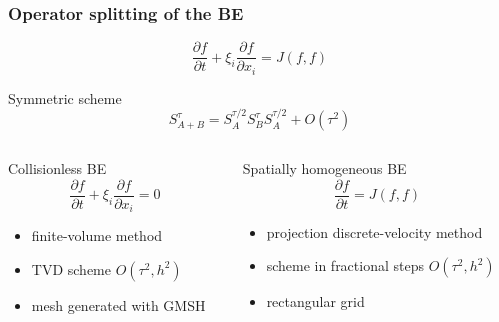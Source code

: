 \documentclass[mathserif]{beamer} %
\newcommand{\pder}[2][]{\frac{\partial#1}{\partial#2}}
\newcommand{\OO}[1]{O(#1)}
\begin{document}
\begin{frame}
    \frametitle{Operator splitting of the BE}
    \vspace{-5pt}
    \begin{equation}
        \pder[f]{t} + \xi_i\pder[f]{x_i} = J(f,f)
    \end{equation}
    \pause\vspace{-10pt}
    \begin{block}{Symmetric scheme}
        \begin{equation}
            S_{A+B}^{\tau} = S_A^{\tau/2}S_B^{\tau}S_A^{\tau/2} + \OO{\tau^2}
        \end{equation}
    \end{block}
    \vspace{-10pt}
    \begin{columns}[T]
        \pause
        \begin{column}{5cm}
            \begin{block}{Collisionless BE}
                \begin{equation}
                    \pder[f]{t} + \xi_i\pder[f]{x_i} = 0
                \end{equation}
                \vspace{-15pt}
                \begin{itemize}
                    \item finite-volume method
                    \item TVD scheme \(\OO{\tau^2, h^2}\)
                    \item mesh generated with GMSH
                \end{itemize}
            \end{block}
        \end{column}
        \pause
        \begin{column}{6.5cm}
            \begin{block}{Spatially homogeneous BE}
                \begin{equation}
                    \pder[f]{t} = J(f,f)
                \end{equation}
                \vspace{-15pt}
                \begin{itemize}
                    \item projection discrete-velocity method
                    \item scheme in fractional steps \(\OO{\tau^2, h^2}\)
                    \item rectangular grid
                \end{itemize}
            \end{block}
        \end{column}
    \end{columns}
\end{frame}
\end{document}
